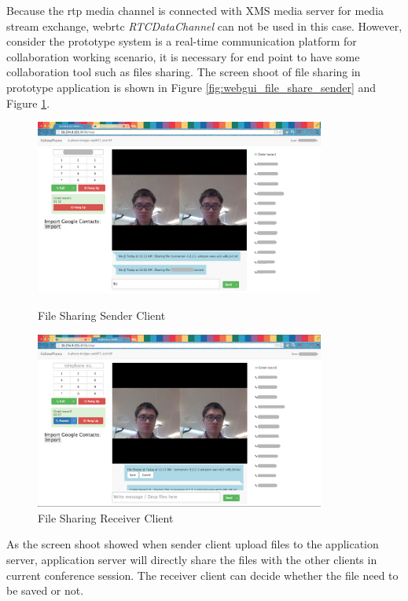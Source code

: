 \par Because the \gls{rtp} media channel is connected with XMS media server for media  stream exchange, \gls{webrtc} \textit{RTCDataChannel} can not be used in this case. However, consider the prototype system is a real-time communication platform for collaboration working scenario, it is necessary for end point to have some collaboration tool such as files sharing. The screen shoot of file sharing in prototype application is shown in Figure \ref{fig:webgui_file_share_sender} and Figure \ref{fig:webgui_file_share_receiver}.

\begin{figure}
	\centering
    	\includegraphics[width=0.85\textwidth,natwidth=610,natheight=642]{figs/webgui_file_share_sender.png}
  	\caption{File Sharing Sender Client}
  	\label{fig:webgui_file_share_sender}
  	    \includegraphics[width=0.85\textwidth,natwidth=610,natheight=642]{figs/webgui_file_share_receiver.png}
  	\caption{File Sharing Receiver Client}
  	\label{fig:webgui_file_share_receiver}
\end{figure}

\par As the screen shoot showed when sender client upload files to the application server, application server will directly share the files with the other clients in current conference session. The receiver client can decide whether the file need to be saved or not.

